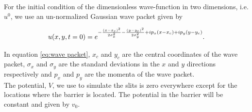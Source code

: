 \documentclass[english,notitlepage,reprint,nofootinbib]{revtex4-2}  %
\begin{document}
	
	
	\noindent
	For the initial condition of the dimensionless wave-function in two dimensions,
	i.e. $u^{0}$, we use an un-normalized Gaussian wave packet given by

	\begin{equation}\label{eq:wave packet}
		\large{u(x,y,t=0) = e^{-\frac{(x-x_c)^2}{2 \sigma_x^2} - \frac{(y-y_c)^2}{2 \sigma_y^2} + i p_x (x-x_c) + i p_y (y-y_c)}}.
	\end{equation}
	
	\noindent
	In equation \ref{eq:wave packet}, $x_c$ and $y_c$ are the central
	coordinates of the wave packet, $\sigma_x$ and $\sigma_y$ are the standard
	deviations in the $x$ and $y$ directions respectively and $p_x$ and $p_y$
	are the momenta of the wave packet.\\
	
	\noindent
	The potential, $V$, we use to simulate the slits is zero everywhere except 
	for the locations where the barrier is located. The potential in the
	barrier will be constant and given by $v_0$.    


	
	
\end{document}

